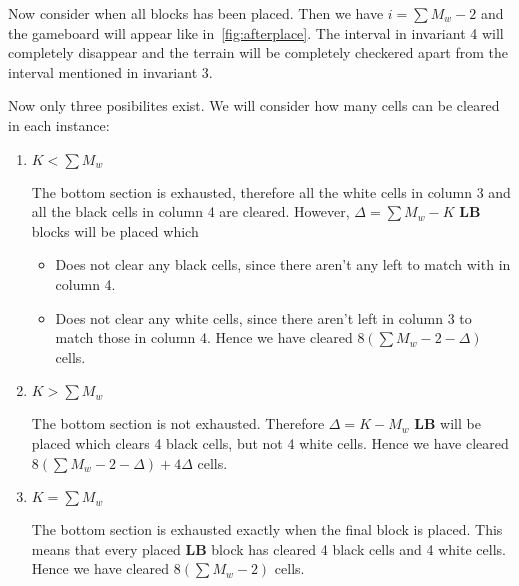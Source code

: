 Now consider when all blocks has been placed. Then we have $i = \sum M_w -2$ and the gameboard will appear like in~\autoref{fig:afterplace}. The interval in invariant 4 will completely disappear and the terrain will be completely checkered apart from the interval mentioned in invariant 3.

Now only three posibilites exist. We will consider how many cells can be cleared in each instance:

\begin{enumerate}
\item $K < \sum M_w$ 

    The bottom section is exhausted, therefore all the white cells in column 3 and all the black cells in column 4 are cleared. However, $\Delta = \sum M_w - K$ $\mathbf{LB}$ blocks will be placed which 
    \begin{itemize}
    \item Does not clear any black cells, since there aren't any left to match with in column 4.
    \item Does not clear any white cells, since there aren't left in column 3 to match those in column 4.
    Hence we have cleared $8 \left( \sum M_w-2-\Delta \right)$ cells.
    \end{itemize}
\item $K > \sum M_w$

    The bottom section is not exhausted. Therefore $\Delta = K - M_w$ $\mathbf{LB}$ will be placed which clears 4 black cells, but not 4 white cells. Hence we have cleared $8 \left( \sum M_w - 2 -\Delta \right) + 4 \Delta$ cells.
\item $K = \sum M_w$

    The bottom section is exhausted exactly when the final block is placed. This means that every placed $\mathbf{LB}$ block has cleared 4 black cells and 4 white cells. Hence we have cleared $8 \left( \sum M_w - 2 \right)$ cells.
\end{enumerate}

